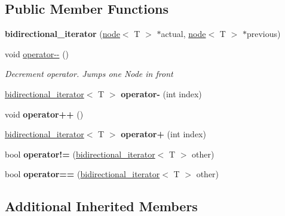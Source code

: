 \subsection*{Public Member Functions}
\begin{DoxyCompactItemize}
\item 
\mbox{\label{classbidirectional__iterator_a69921e1ae2cf5bffe5573576784d1e45}} 
{\bfseries bidirectional\+\_\+iterator} (\mbox{\hyperlink{classnode}{node}}$<$ T $>$ $\ast$actual, \mbox{\hyperlink{classnode}{node}}$<$ T $>$ $\ast$previous)
\item 
void \mbox{\hyperlink{classbidirectional__iterator_a1d3d0fc56cc4598e4566ff528a88e5f1}{operator-\/-\/}} ()
\begin{DoxyCompactList}\small\item\em Decrement operator. Jumps one Node in front \end{DoxyCompactList}\item 
\mbox{\label{classbidirectional__iterator_adcb9dc850676b62f179992bc8520c119}} 
\mbox{\hyperlink{classbidirectional__iterator}{bidirectional\+\_\+iterator}}$<$ T $>$ {\bfseries operator-\/} (int index)
\item 
\mbox{\label{classbidirectional__iterator_a06d291c06916668f6b2c26a7e5e4b119}} 
void {\bfseries operator++} ()
\item 
\mbox{\label{classbidirectional__iterator_a3ebecdf952ece1ca5171859d6c3ddb62}} 
\mbox{\hyperlink{classbidirectional__iterator}{bidirectional\+\_\+iterator}}$<$ T $>$ {\bfseries operator+} (int index)
\item 
\mbox{\label{classbidirectional__iterator_a6fdf84eac8deafe284712e76a64e8c5b}} 
bool {\bfseries operator!=} (\mbox{\hyperlink{classbidirectional__iterator}{bidirectional\+\_\+iterator}}$<$ T $>$ other)
\item 
\mbox{\label{classbidirectional__iterator_ab78fc223ba910e472db85cda01cdd20b}} 
bool {\bfseries operator==} (\mbox{\hyperlink{classbidirectional__iterator}{bidirectional\+\_\+iterator}}$<$ T $>$ other)
\end{DoxyCompactItemize}
\subsection*{Additional Inherited Members}


